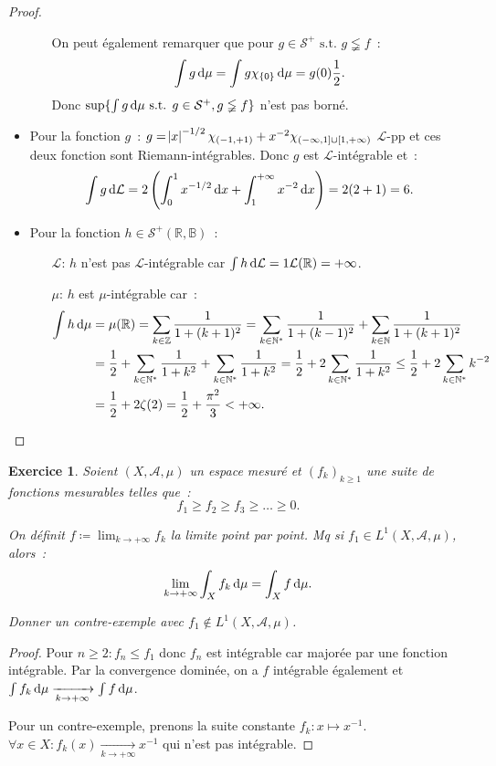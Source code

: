 \documentclass{article}
\newtheorem{ex}{Exercice}[section]
\theoremstyle{definition}
\newcommand{\pinfty}{{+\infty}}
\newcommand{\minfty}{{-\infty}}
\newcommand{\st}{\text{ s.t. }}
\newcommand{\N}{{\mathbb N}}
\newcommand{\Z}{{\mathbb Z}}
\newcommand{\R}{{\mathbb R}}
\newcommand{\B}{{\mathbb B}}
\begin{document}
\begin{proof}
\begin{itemize}
\begin{itemize}
		On peut également remarquer que pour $g \in \mathcal S^+ \st g \lneqq f$~:
		\[\int g\dif\mu = \int g\chi_{\{0\}}\dif\mu = g(0)\frac 12.\]
		Donc $\sup\{\int g\dif\mu \st g \in \mathcal S^+, g \lneqq f\}$ n'est pas borné.
	\end{itemize}
	\item Pour la fonction $g$~: $g = \abs x^{-1/2}\chi_{(-1, +1)} + x^{-2}\chi_{(\minfty, 1] \cup [1, \pinfty)}$ $\mathcal L$-pp et ces deux fonction sont Riemann-intégrables. Donc
	$g$ est $\mathcal L$-intégrable et~:
	\[\int g\dif \mathcal L = 2\left(\int_0^1x^{-1/2}\dif x + \int_1^\pinfty x^{-2}\dif x\right) = 2(2+1) = 6.\]
	\item Pour la fonction $h \in \mathcal S^+(\R, \B)$~:
	\begin{itemize}
		\item[$\mathcal L$:] $h$ n'est pas $\mathcal L$-intégrable car $\int h\dif\mathcal L = 1\mathcal L(\R) = \pinfty$.
		\item[$\mu$:]        $h$ est $\mu$-intégrable car~:
		\begin{align*}
			\int h\dif\mu &= \mu(\R) = \sum_{k \in \Z}\frac 1{1+(k+1)^2} = \sum_{k \in \N^*}\frac 1{1+(k-1)^2} + \sum_{k \in \N}\frac 1{1+(k+1)^2} \\
				&= \frac 12 + \sum_{k \in \N^*}\frac 1{1+k^2} + \sum_{k \in \N^*}\frac 1{1+k^2} = \frac 12 + 2\sum_{k \in \N^*}\frac 1{1+k^2} \leq \frac 12 + 2\sum_{k \in \N^*}k^{-2} \\
				&= \frac 12 + 2\zeta(2) = \frac 12 + \frac {\pi^2}3 < \pinfty.
		\end{align*}
	\end{itemize}
\end{itemize}
\end{proof}

\begin{ex} Soient $(X, \mathcal A, \mu)$ un espace mesuré et $(f_k)_{k \geq 1}$ une suite de fonctions mesurables telles que~:
\[f_1 \geq f_2 \geq f_3 \geq \ldots \geq 0.\]

On définit $f \coloneqq  \lim_{k \to \pinfty}f_k$ la limite point par point. Mq si $f_1 \in L^1(X, \mathcal A, \mu)$, alors~:
\[\lim_{k \to \pinfty}\int_Xf_k\dif\mu = \int_Xf\dif\mu.\]

Donner un contre-exemple avec $f_1 \not \in L^1(X, \mathcal A, \mu)$.
\end{ex}

\begin{proof} Pour $n \geq 2 : f_n \leq f_1$ donc $f_n$ est intégrable car majorée par une fonction intégrable. Par la convergence dominée, on a $f$ intégrable
également et $\int f_k\dif\mu \xrightarrow[k \to \pinfty]{} \int f\dif\mu$.

Pour un contre-exemple, prenons la suite constante $f_k : x \mapsto x^{-1}$. $\forall x \in X : f_k(x) \xrightarrow[k \to \pinfty]{} x^{-1}$ qui n'est pas intégrable.
\end{proof}
\end{document}
